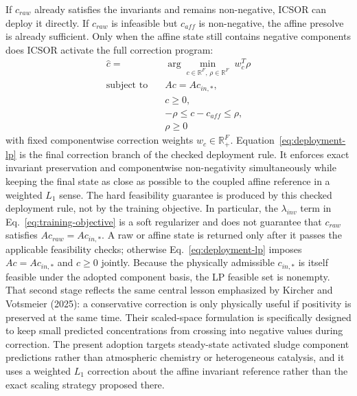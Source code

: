 \documentclass[a4paper,fleqn]{cas-sc}
\DeclareRobustCommand{\currentrev}[1]{{\color{currentRevisionBlue}#1}}
\newenvironment{currentrevblock}{\begingroup\color{currentRevisionBlue}}{\endgroup}
\DeclareRobustCommand{\currentrev}[1]{#1}
\newenvironment{currentrevblock}{}{}
\newenvironment{revblock}{}{}
\begin{document}
\begin{revblock}
If $c_{raw}$ already satisfies the invariants and remains non-negative, ICSOR can deploy it directly. If $c_{raw}$ is infeasible but $c_{aff}$ is non-negative, the affine presolve is already sufficient. Only when the affine state still contains negative components does ICSOR activate the full correction program:
\begin{equation}
\label{eq:deployment-lp}
\begin{aligned}
\hat{c} = {}& \arg\min_{c \in \mathbb{R}^{F},\, \rho \in \mathbb{R}^{F}} \; w_c^T \rho \\
\text{subject to} \quad {}& A c = A c_{in,*}, \\
& c \ge 0, \\
& -\rho \le c - c_{aff} \le \rho, \\
& \rho \ge 0
\end{aligned}
\end{equation}
with fixed componentwise correction weights $w_c \in \mathbb{R}_{+}^{F}$. \currentrev{Equation~\eqref{eq:deployment-lp} is the final correction branch of the checked deployment rule.} It enforces exact invariant preservation and componentwise non-negativity simultaneously while keeping the final state as close as possible to the coupled affine reference in a weighted $L_1$ sense.
\begin{currentrevblock}
The hard feasibility guarantee is produced by this checked deployment rule, not by the training objective. In particular, the $\lambda_{inv}$ term in Eq.~\eqref{eq:training-objective} is a soft regularizer and does not guarantee that $c_{raw}$ satisfies $Ac_{raw}=Ac_{in,*}$. A raw or affine state is returned only after it passes the applicable feasibility checks; otherwise Eq.~\eqref{eq:deployment-lp} imposes $Ac=Ac_{in,*}$ and $c\geq 0$ jointly. Because the physically admissible $c_{in,*}$ is itself feasible under the adopted component basis, the LP feasible set is nonempty.
\end{currentrevblock}
That second stage reflects the same central lesson emphasized by Kircher and Votsmeier (2025): a conservative correction is only physically useful if positivity is preserved at the same time. Their scaled-space formulation is specifically designed to keep small predicted concentrations from crossing into negative values during correction. The present adoption targets steady-state activated sludge component predictions rather than atmospheric chemistry or heterogeneous catalysis, and it uses a weighted $L_1$ correction about the affine invariant reference rather than the exact scaling strategy proposed there.


\end{revblock}
\end{document}
